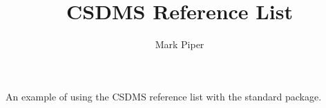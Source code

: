\documentclass[11pt]{article}
\begin{document}
\title{CSDMS Reference List}
\author{Mark Piper}
\maketitle

An example of using the CSDMS reference list
with the standard \BibTeX package.

\cite{tucker:2010}
\cite{overeem:2015a}
\cite{kettner:2008}
\cite{hutton:2008}
\cite{piper:2015}
\cite{blanca:2017}
\cite{jupyter:2015}
\cite{gdal:2017}


\end{document}
